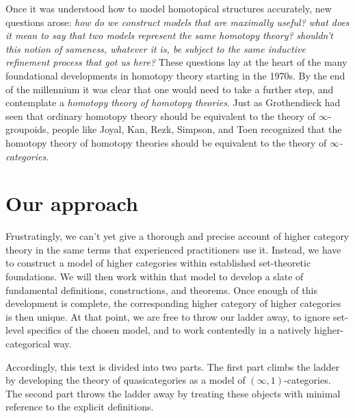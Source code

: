 Once it was understood how to model homotopical structures accurately, new questions arose:
\emph{how do we construct models that are maximally useful?}
\emph{what does it mean to say that two models represent the same homotopy theory?}
\emph{shouldn't this notion of sameness, whatever it is, be subject to the same inductive refinement process that got us here?}
These questions lay at the heart of the many foundational developments in homotopy theory starting in the 1970s.
By the end of the millennium it was clear that one would need to take a further step, and contemplate a \emph{homotopy theory of homotopy theories}.
Just as Grothendieck had seen that ordinary homotopy theory should be equivalent to the theory of $\infty$-groupoids,
people like Joyal, Kan, Rezk, Simpson, and Toen recognized that the homotopy theory of homotopy theories should be equivalent to the theory of \emph{$\infty$-categories}.



\section*{Our approach}%
\label{sec:approach}

Frustratingly, we can't yet give a thorough and precise account of higher category theory in the same terms that experienced practitioners use it.
Instead, we have to construct a model of higher categories within established set-theoretic foundations.
We will then work within that model to develop a slate of fundamental definitions, constructions, and theorems.
Once enough of this development is complete,
the corresponding higher category of higher categories is then unique.
At that point, we are free to throw our ladder away, to ignore set-level specifics of the chosen model, and to work contentedly in a natively higher-categorical way.

Accordingly, this text is divided into two parts.
The first part climbs the ladder by developing the theory of quasicategories as a model of $(\infty,1)$-categories.
The second part throws the ladder away by treating these objects with minimal reference to the explicit definitions.
